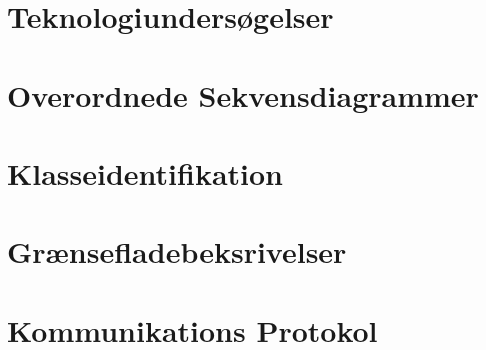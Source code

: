 \newpage
\section{Teknologiundersøgelser}


\newpage
\section{Overordnede Sekvensdiagrammer}


\newpage
\section{Klasseidentifikation}


\newpage
\section{Grænsefladebeksrivelser}


\newpage
\section{Kommunikations Protokol}
